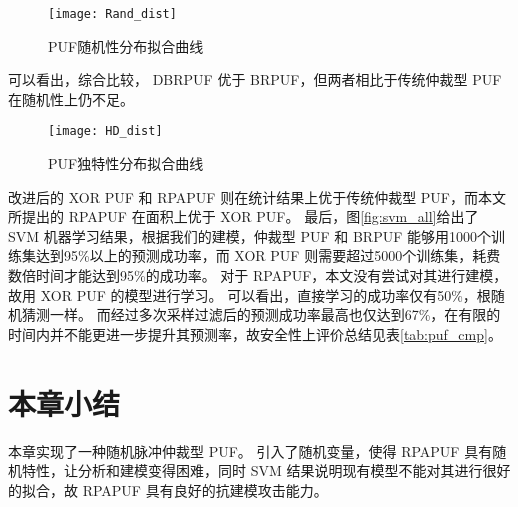 \begin{figure}[htb!]
\centering
\texttt{[image: Rand\_dist]}
\caption{PUF随机性分布拟合曲线}
\label{fig:pufs_rand}
\end{figure}

可以看出，综合比较， DBRPUF 优于 BRPUF，但两者相比于传统仲裁型 PUF 在随机性上仍不足。

\begin{figure}[htb!]
\centering
\texttt{[image: HD\_dist]}
\caption{PUF独特性分布拟合曲线}
\label{fig:pufs_uniq}
\end{figure}

改进后的 XOR PUF 和 RPAPUF 则在统计结果上优于传统仲裁型 PUF，而本文所提出的 RPAPUF 在面积上优于 XOR PUF。
最后，图\ref{fig:svm_all}给出了 SVM 机器学习结果，根据我们的建模，仲裁型 PUF 和 BRPUF 能够用1000个训练集达到95\%以上的预测成功率，而 XOR PUF 则需要超过5000个训练集，耗费数倍时间才能达到95\%的成功率。
对于 RPAPUF，本文没有尝试对其进行建模，故用 XOR PUF 的模型进行学习。
可以看出，直接学习的成功率仅有50\%，根随机猜测一样。
而经过多次采样过滤后的预测成功率最高也仅达到67\%，在有限的时间内并不能更进一步提升其预测率，故安全性上评价总结见表\ref{tab:puf_cmp}。

\section{本章小结}

本章实现了一种随机脉冲仲裁型 PUF。
引入了随机变量，使得 RPAPUF 具有随机特性，让分析和建模变得困难，同时 SVM 结果说明现有模型不能对其进行很好的拟合，故 RPAPUF 具有良好的抗建模攻击能力。
